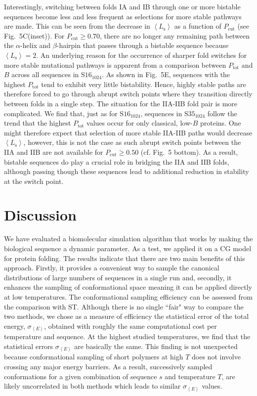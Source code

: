 \documentclass[
aip,
rsi,%
amsmath,amssymb,
reprint,%
]{revtex4-1}
\newcommand	 {\sbar}	{{s}}
\newcommand {\Pcut}     	{{P_\mathrm{cut}}}
\newcommand {\Ptot}	{{P_\mathrm{tot}}}
\newcommand {\sigE}	{{\sigma_{\left < E \right >}}}
\newcommand {\SI}		{${\mathrm{S16}_{1024}}$}
\newcommand {\SII}		{${\mathrm{S35}_{1024}}$}
\begin{document}
Interestingly, switching between folds IA and IB through one or more bistable sequences become less and less frequent as selections for more stable pathways are made. This can be seen from the decrease in $\left <L_\mathrm{s}\right >$ as a function of $\Pcut$ (see Fig.~5C(inset)). For $\Pcut\ge0.70$, there are no longer any remaining path between the $\alpha$-helix and $\beta$-hairpin that passes through a bistable sequence because $\left <L_\mathrm{s}\right > =  2$. An underlying reason for the occurrence of sharper fold switches for more stable mutational pathways is apparent from a comparison between $\Ptot$ and $B$ across all sequences in {\SI}. As shown in Fig.~5E, sequences with the highest $\Ptot$ tend to exhibit very little bistability. Hence, highly stable paths are therefore forced to go through abrupt switch points where they transition directly between folds in a single step. The situation for the IIA-IIB fold pair is more complicated. We find that, just as for {\SI}, sequences in {\SII} follow the trend that the highest $\Ptot$ values occur for only classical, low-$B$ proteins. One might therefore expect that selection of more stable IIA-IIB paths would decrease $\left <L_\mathrm{s}\right >$, however, this is not the case as such abrupt switch points between the IIA and IIB are not available for $\Pcut\ge0.50$ (cf. Fig.~5 bottom). As a result, bistable sequences do play a crucial role in bridging the IIA and IIB folds, although passing though these sequences lead to additional reduction in stability at the switch point. 
 
\section{Discussion}
\noindent
We have evaluated a biomolecular simulation algorithm that works by making the biological sequence a dynamic parameter. As a test, we applied it on a CG model for protein folding. The results indicate that there are two main benefits of this approach. Firstly, it provides a convenient way to sample the canonical distributions of large numbers of sequences in a single run and, secondly, it enhances the sampling of conformational space meaning it can be applied directly at low temperatures. The conformational sampling efficiency can be assessed from the comparison with ST. Although there is no single ``fair" way to compare the two methods, we chose as a measure of efficiency the statistical error of the total energy, $\sigE$, obtained with roughly the same computational cost per temperature and sequence. At the highest studied temperatures, we find that the statistical errors $\sigE$ are basically the same. This finding is not unexpected because conformational sampling of short polymers at high $T$ does not involve crossing any major energy barriers. As a result, successively sampled conformations for a given combination of sequence $\sbar$ and temperature $T$, are likely uncorrelated in both methods which leads to similar $\sigE$ values. 
\end{document}
